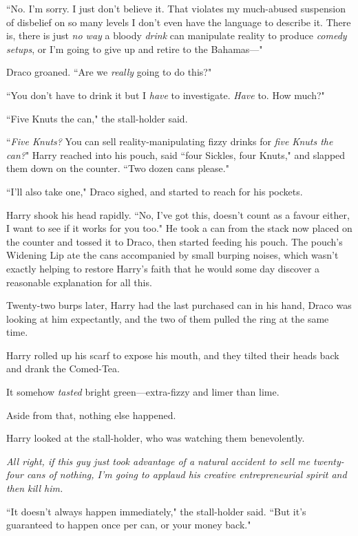 ``No. I'm sorry. I just don't believe it. That violates my much-abused suspension of disbelief on so many levels I don't even have the language to describe it. There is, there is just \emph{no way} a bloody \emph{drink} can manipulate reality to produce \emph{comedy setups}, or I'm going to give up and retire to the Bahamas—"

Draco groaned. ``Are we \emph{really} going to do this?"

``You don't have to drink it but I \emph{have} to investigate. \emph{Have} to. How much?"

``Five Knuts the can," the stall-holder said.

``\emph{Five Knuts?} You can sell reality-manipulating fizzy drinks for \emph{five Knuts the can?}" Harry reached into his pouch, said ``four Sickles, four Knuts," and slapped them down on the counter. ``Two dozen cans please."

``I'll also take one," Draco sighed, and started to reach for his pockets.

Harry shook his head rapidly. ``No, I've got this, doesn't count as a favour either, I want to see if it works for you too." He took a can from the stack now placed on the counter and tossed it to Draco, then started feeding his pouch. The pouch's Widening Lip ate the cans accompanied by small burping noises, which wasn't exactly helping to restore Harry's faith that he would some day discover a reasonable explanation for all this.

Twenty-two burps later, Harry had the last purchased can in his hand, Draco was looking at him expectantly, and the two of them pulled the ring at the same time.

Harry rolled up his scarf to expose his mouth, and they tilted their heads back and drank the Comed-Tea.

It somehow \emph{tasted} bright green—extra-fizzy and limer than lime.

Aside from that, nothing else happened.

Harry looked at the stall-holder, who was watching them benevolently.

\emph{All right, if this guy just took advantage of a natural accident to sell me twenty-four cans of nothing, I'm going to applaud his creative entrepreneurial spirit and then kill him.}

``It doesn't always happen immediately," the stall-holder said. ``But it's guaranteed to happen once per can, or your money back."

